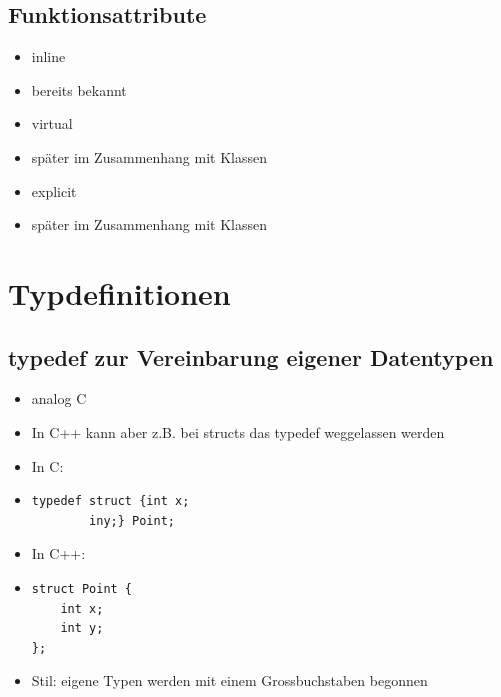 \subsection{Funktionsattribute}
\label{sec:Funktionsattribute}
\begin{itemize}
	\item inline
	\item[\-] bereits bekannt
	\item virtual
	\item[\-] später im Zusammenhang mit Klassen
	\item explicit
	\item[\-] später im Zusammenhang mit Klassen
\end{itemize}


\section{Typdefinitionen}
\label{sec:Typdefinitionen}

\subsection{typedef zur Vereinbarung eigener Datentypen\hfill}
\label{sec:typedef zur Vereinbarung eigener Datentypen}
\begin{itemize}
	\item analog C
	\item In C++ kann aber z.B. bei structs das typedef weggelassen werden
	\item In C:
	\item[\-]
\noindent
\begin{minipage}{\linewidth}
\begin{lstlisting}
typedef struct {int x;
		iny;} Point;
\end{lstlisting}
\end{minipage}
	\item In C++:
	\item[\-]
\noindent
\begin{minipage}{\linewidth}
\begin{lstlisting}
struct Point {
	int x;
	int y;
};
\end{lstlisting}
\end{minipage}
	\item Stil: eigene Typen werden mit einem Grossbuchstaben begonnen
\end{itemize}

